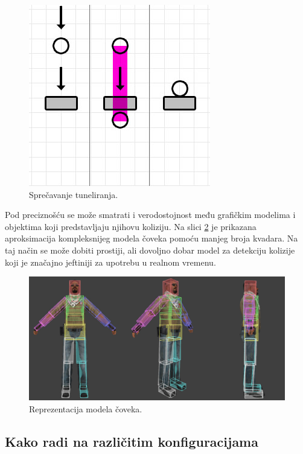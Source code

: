\documentclass{article}
\begin{document}
{\begin{figure}[h!]
	\begin{center}
	\includegraphics[scale=0.45]{tunnel_fixed.png}
	\end{center}
	\caption{Sprečavanje tuneliranja.}
	\label{fig:tunnel_fix}
\end{figure}

Pod preciznošću se može smatrati i verodostojnost među grafičkim modelima i objektima koji predstavljaju njihovu koliziju.
Na slici \ref{fig:hitbox} je prikazana aproksimacija kompleksnijeg modela čoveka pomoću manjeg broja kvadara.
Na taj način se može dobiti prostiji, ali dovoljno dobar model za detekciju kolizije koji je značajno 
jeftiniji za upotrebu u realnom vremenu. 

\begin{figure}[h!]
	\begin{center}
	\includegraphics[scale=0.45]{hitbox.png}
	\end{center}
	\caption{Reprezentacija modela čoveka.}
	\label{fig:hitbox}
\end{figure}

\subsection{Kako radi na različitim konfiguracijama}

}
\end{document}
